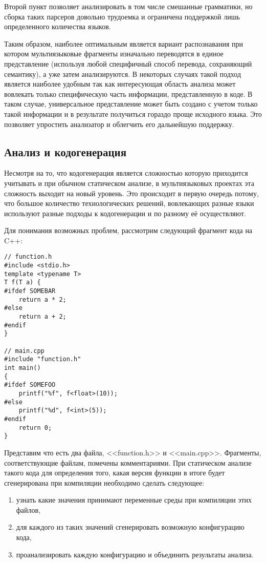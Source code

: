 Второй пункт позволяет анализировать в том числе смешанные грамматики, 
но сборка таких парсеров довольно трудоемка и ограничена поддержкой лишь определенного количества языков.

Таким образом, наиболее оптимальным является вариант распознавания при котором мультиязыковые фрагменты
изначально переводятся в единое представление (используя любой специфичный способ перевода, сохраняющий семантику), а
уже затем анализируются. В некоторых случаях такой подход является наиболее удобным так как
интересующая область анализа может вовлекать только специфическую часть информации, представленную в коде.
В таком случае, универсальное представление может быть создано с учетом только такой информации и
в результате получиться гораздо проще исходного языка. Это позволяет упростить анализатор и облегчить его
дальнейшую поддержку.

\subsection{Анализ и кодогенерация}

Несмотря на то, что кодогенерация является сложностью которую приходится учитывать и при обычном
статическом анализе, в мультиязыковых проектах эта сложность выходит на новый уровень.
Это происходит в первую очередь потому, что большое количество технологических решений, вовлекающих
разные языки используют разные подходы к кодогенерации и по разному её осуществляют.

Для понимания возможных проблем, рассмотрим следующий фрагмент кода на C++:

\begin{verbatim}
// function.h
#include <stdio.h>
template <typename T>
T f(T a) {
#ifdef SOMEBAR
    return a * 2;
#else
    return a + 2;
#endif
}

// main.cpp
#include "function.h"
int main()
{
#ifdef SOMEFOO
    printf("%f", f<float>(10));
#else
    printf("%d", f<int>(5));
#endif
    return 0;
}
\end{verbatim}

Представим что есть два файла, <<function.h>> и <<main.cpp>>. Фрагменты, соответствующие файлам, помечены
комментариями. При статическом анализе такого кода для определения того, какая версия функции в итоге будет
сгенерирована при компиляции необходимо сделать следующее:
\begin{enumerate}[1)]
    \item узнать какие значения принимают переменные среды при компиляции этих файлов,
    \item для каждого из таких значений сгенерировать возможную конфигурацию кода,
    \item проанализировать каждую конфигурацию и объединить результаты анализа.
\end{enumerate}

